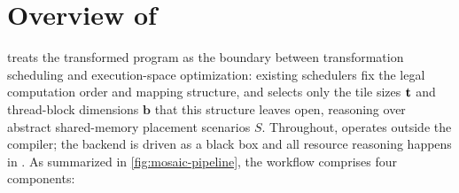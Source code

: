 \section{Overview of \name}
\label{sec:overview}

\name treats the transformed program as the boundary between transformation scheduling and execution-space optimization: existing schedulers fix the legal computation order and mapping structure, and \name selects only the tile sizes \(\mathbf{t}\) and thread-block dimensions \(\mathbf{b}\) that this structure leaves open, reasoning over abstract shared-memory placement scenarios \(S\). Throughout, \name operates outside the compiler; the backend is driven as a black box and all resource reasoning happens in \name. As summarized in \autoref{fig:mosaic-pipeline}, the workflow comprises four components:

%

